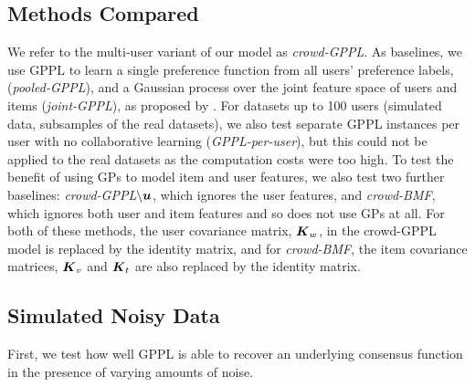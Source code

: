 \subsection{Methods Compared}

We refer to the multi-user variant of our model as \emph{crowd-GPPL}.
As baselines, we use GPPL to learn a single preference function from all users' preference labels, (\emph{pooled-GPPL}), and a Gaussian process over the joint feature space of users and items 
(\emph{joint-GPPL}), as proposed by \citet{guo2010gaussian}.
For datasets up to 100 users (simulated data, subsamples of the real datasets), 
we also test separate GPPL instances per user with no collaborative
learning (\emph{GPPL-per-user}), but this could not be applied to the real datasets as the 
computation costs were too high.
To test the benefit of using GPs to model item and user features,
we also test two further baselines: 
\emph{crowd-GPPL$\mathbf{\setminus \boldsymbol u}$}, which ignores the user features,
and \emph{crowd-BMF}, which ignores both user and item features and so does not use GPs at all. 
For both of these methods, the user covariance matrix, $\boldsymbol K_w$, in the crowd-GPPL model is replaced by the identity matrix, and for \emph{crowd-BMF}, the item covariance matrices, $\boldsymbol K_v$ and $\boldsymbol K_t$ are also replaced by the identity matrix.



\subsection{Simulated Noisy Data}\label{sec:exp_synth}

First, we test how well GPPL is able to recover an underlying consensus function
in the presence of varying amounts of noise.

